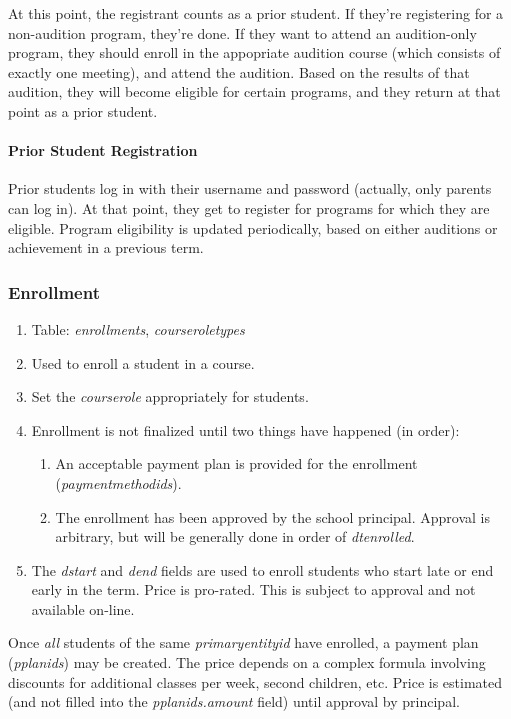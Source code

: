 \documentclass[11pt]{article}
\begin{document}
At this point, the registrant counts as a prior student.  If they're registering for a non-audition program, they're done.  If they want to attend an audition-only program, they should enroll in the appopriate audition course (which consists of exactly one meeting), and attend the audition.  Based on the results of that audition, they will become eligible for certain programs, and they return at that point as a prior student.

\paragraph{Prior Student Registration}

Prior students log in with their username and password (actually, only parents can log in).  At that point, they get to register for programs for which they are eligible.  Program eligibility is updated periodically, based on either auditions or achievement in a previous term.

\subsubsection{Enrollment}

\begin{enumerate}
 \item Table: \emph{enrollments}, \emph{courseroletypes}
 \item Used to enroll a student in a course.
 \item Set the \emph{courserole} appropriately for students.
 \item Enrollment is not finalized until two things have happened (in order):
 \begin{enumerate}
	\item An acceptable payment plan is provided for the enrollment (\emph{paymentmethodids}).
	\item The enrollment has been approved by the school principal.  Approval is arbitrary, but will be generally done in order of \emph{dtenrolled}.
 \end{enumerate}
 \item The \emph{dstart} and \emph{dend} fields are used to enroll students who start late or end early in the term.  Price is pro-rated.  This is subject to approval and not available on-line.
 \end{enumerate}

Once \emph{all} students of the same \emph{primaryentityid} have
enrolled, a payment plan (\emph{pplanids}) may be created.  The price
depends on a complex formula involving discounts for additional
classes per week, second children, etc.  Price is estimated (and not
filled into the \emph{pplanids.amount} field) until approval by
principal.
\end{document}
